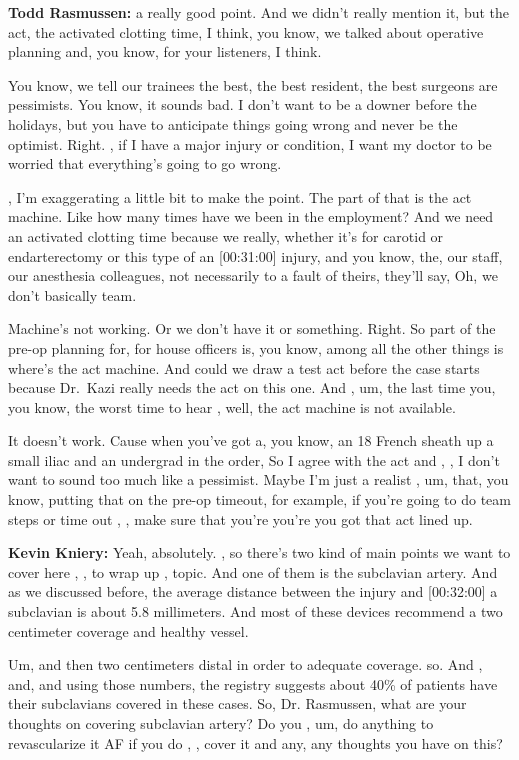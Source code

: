 \documentclass[
]{book}
\begin{document}
\textbf{Todd Rasmussen:} a really good point. And we didn't really mention
it, but the act, the activated clotting time, I think, you know, we
talked about operative planning and, you know, for your listeners, I
think.

You know, we tell our trainees the best, the best resident, the best
surgeons are pessimists. You know, it sounds bad. I don't want to be a
downer before the holidays, but you have to anticipate things going
wrong and never be the optimist. Right. , if I have a major injury or
condition, I want my doctor to be worried that everything's going to go
wrong.

, I'm exaggerating a little bit to make the point. The part of that is
the act machine. Like how many times have we been in the employment? And
we need an activated clotting time because we really, whether it's for
carotid or endarterectomy or this type of an {[}00:31:00{]} injury, and you
know, the, our staff, our anesthesia colleagues, not necessarily to a
fault of theirs, they'll say, Oh, we don't basically team.

Machine's not working. Or we don't have it or something. Right. So part
of the pre-op planning for, for house officers is, you know, among all
the other things is where's the act machine. And could we draw a test
act before the case starts because Dr.~Kazi really needs the act on this
one. And , um, the last time you, you know, the worst time to hear ,
well, the act machine is not available.

It doesn't work. Cause when you've got a, you know, an 18 French sheath
up a small iliac and an undergrad in the order, So I agree with the act
and , , I don't want to sound too much like a pessimist. Maybe I'm just
a realist , um, that, you know, putting that on the pre-op timeout, for
example, if you're going to do team steps or time out , , make sure that
you're you're you got that act lined up.

\textbf{Kevin Kniery:} Yeah, absolutely. , so there's two kind of main points
we want to cover here , , to wrap up , topic. And one of them is the
subclavian artery. And as we discussed before, the average distance
between the injury and {[}00:32:00{]} a subclavian is about 5.8 millimeters.
And most of these devices recommend a two centimeter coverage and
healthy vessel.

Um, and then two centimeters distal in order to adequate coverage. so.
And , and, and using those numbers, the registry suggests about 40\% of
patients have their subclavians covered in these cases. So, Dr.
Rasmussen, what are your thoughts on covering subclavian artery? Do you
, um, do anything to revascularize it AF if you do , , cover it and any,
any thoughts you have on this?
\end{document}
